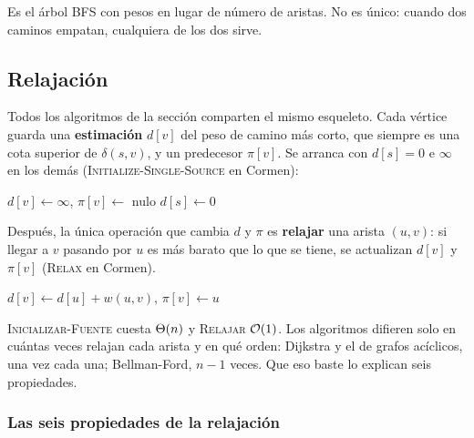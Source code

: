 \documentclass[11pt,letterpaper]{article}
\begin{document}
Es el árbol BFS con pesos en lugar de número de aristas. No es único:
cuando dos caminos empatan, cualquiera de los dos sirve.


\subsection*{Relajación}

Todos los algoritmos de la sección comparten el mismo esqueleto. Cada
vértice guarda una \textbf{estimación} $d[v]$ del peso de camino más
corto, que siempre es una cota superior de $\delta(s, v)$, y un
predecesor $\pi[v]$. Se arranca con $d[s] = 0$ e $\infty$ en los
demás (\textsc{Initialize-Single-Source} en Cormen):

\begin{algorithm}[H]
\caption{\textsc{Inicializar-Fuente}$(G, s)$}
\label{alg:inicializar-fuente}
\begin{algorithmic}[1]
    \State $d[v] \gets \infty$, \quad $\pi[v] \gets$ nulo
  \EndFor
  \State $d[s] \gets 0$
\EndProcedure
\end{algorithmic}
\end{algorithm}

Después, la única operación que cambia $d$ y $\pi$ es
\textbf{relajar} una arista $(u, v)$: si llegar a $v$ pasando por $u$
es más barato que lo que se tiene, se actualizan $d[v]$ y $\pi[v]$
(\textsc{Relax} en Cormen).

\begin{algorithm}[H]
\caption{\textsc{Relajar}$(u, v, w)$}
\label{alg:relajar}
\begin{algorithmic}[1]
    \State $d[v] \gets d[u] + w(u, v)$, \quad $\pi[v] \gets u$
  \EndIf
\EndProcedure
\end{algorithmic}
\end{algorithm}

\textsc{Inicializar-Fuente} cuesta $\Theta\!\left(n\right)$ y \textsc{Relajar}
$\mathcal{O}\!\left(1\right)$. Los algoritmos difieren solo en cuántas veces relajan cada
arista y en qué orden: Dijkstra y el de grafos acíclicos, una vez cada
una; Bellman-Ford, $n - 1$ veces. Que eso baste lo explican seis
propiedades.

\subsubsection*{Las seis propiedades de la relajación}
\end{document}

